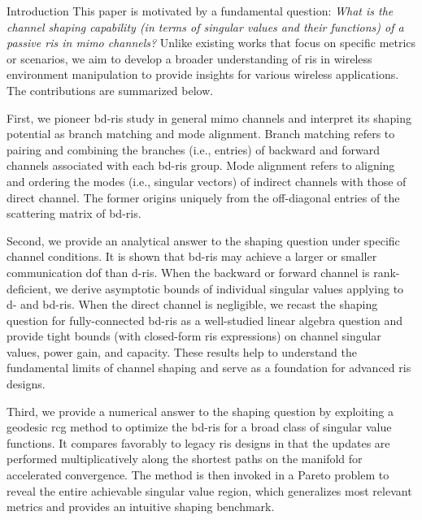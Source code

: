 \documentclass[journal]{IEEEtran}
\begin{document}
\begin{section}{Introduction}
		\label{sc:contributions}
		This paper is motivated by a fundamental question:
		\emph{What is the channel shaping capability (in terms of singular values and their functions) of a passive \gls{ris} in \gls{mimo} channels?}
		Unlike existing works that focus on specific metrics or scenarios, we aim to develop a broader understanding of \gls{ris} in wireless environment manipulation to provide insights for various wireless applications.
		The contributions are summarized below.

		First, we pioneer \gls{bd}-\gls{ris} study in general \gls{mimo} channels and interpret its shaping potential as branch matching and mode alignment.
		Branch matching refers to pairing and combining the branches (i.e., entries) of backward and forward channels associated with each \gls{bd}-\gls{ris} group.
		Mode alignment refers to aligning and ordering the modes (i.e., singular vectors) of indirect channels with those of direct channel.
		The former origins uniquely from the off-diagonal entries of the scattering matrix of \gls{bd}-\gls{ris}.

		Second, we provide an analytical answer to the shaping question under specific channel conditions.
		It is shown that \gls{bd}-\gls{ris} may achieve a larger or smaller communication \gls{dof} than \gls{d}-\gls{ris}.
		When the backward or forward channel is rank-deficient, we derive asymptotic bounds of individual singular values applying to \gls{d}- and \gls{bd}-\gls{ris}.
		When the direct channel is negligible, we recast the shaping question for fully-connected \gls{bd}-\gls{ris} as a well-studied linear algebra question and provide tight bounds (with closed-form \gls{ris} expressions) on channel singular values, power gain, and capacity.
		These results help to understand the fundamental limits of channel shaping and serve as a foundation for advanced \gls{ris} designs.


		Third, we provide a numerical answer to the shaping question by exploiting a geodesic \gls{rcg} method to optimize the \gls{bd}-\gls{ris} for a broad class of singular value functions.
		It compares favorably to legacy \gls{ris} designs in that the updates are performed multiplicatively along the shortest paths on the manifold for accelerated convergence.
		The method is then invoked in a Pareto problem to reveal the entire achievable singular value region, which generalizes most relevant metrics and provides an intuitive shaping benchmark.


\end{section}
\end{document}
